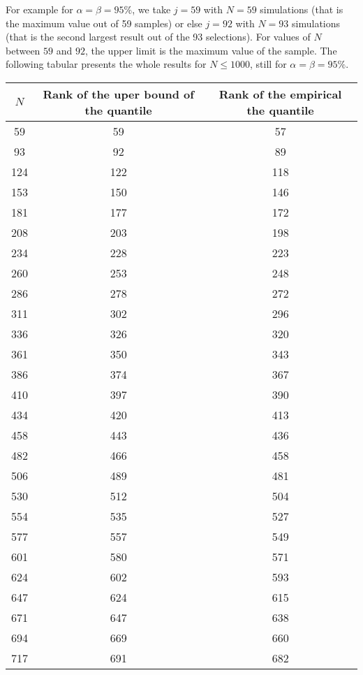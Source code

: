 {  For example for  $\alpha = \beta = 95\%$, we take $j=59$ with  $N = 59$ simulations (that is the maximum value out of  59 samples) or else  $j = 92$ with $N = 93$ simulations (that is the second largest result out of the 93 selections). For values of $N$ between $59$ and $92$, the upper limit is the maximum value of the sample. The following tabular presents the whole results for $N \leq 1000$, still for $\alpha = \beta = 95\%$. \vspace{2mm}



  \begin{center}
    \footnotesize
    \begin{tabular}{|c|c|c|}
      \hline
      $N$ & Rank of the uper bound of the quantile & Rank of the empirical the quantile \\
      \hline
      59 & 59 & 57\\
      93 & 92 & 89\\
      124 & 122 & 118\\
      153 & 150 & 146 \\
      181 & 177 & 172 \\
      208 & 203 & 198 \\
      234 & 228 & 223 \\
      260 & 253 & 248 \\
      286 & 278 & 272 \\
      311 & 302 & 296 \\
      336 & 326 & 320 \\
      361 & 350 & 343 \\
      386 & 374 & 367 \\
      410 & 397 & 390 \\
      434 & 420 & 413 \\
      458 & 443 & 436 \\
      482 & 466 & 458 \\
      506 & 489 & 481 \\
      530 & 512 & 504 \\
      554 & 535 & 527 \\
      577 & 557 & 549 \\
      601 & 580 & 571 \\
      624 & 602 & 593 \\
      647 & 624 & 615 \\
      671 & 647 & 638 \\
      694 & 669 & 660 \\
      717 & 691 & 682 \\

\end{tabular}
\end{center}}
